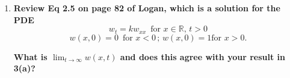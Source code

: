 \documentclass[11pt]{article}
\newenvironment{solution}
  {\renewcommand\qedsymbol{$\blacksquare$}\begin{proof}[Solution]}
  {\end{proof}}
\begin{document}
\begin{enumerate}
\begin{enumerate}
\textbf{What is the value of $\lim_{t\rightarrow \infty} u(x, t)$?}

\begin{solution}
$u$ is a solution to the diffusion equation on the infinite domain with bounded initial value $u(x, 0) = \phi(x)$. Consequently, the solution (in the Poisson Integral representation form) is 
\[ u(x, t) = \frac{1}{\sqrt{\pi}} \int_{-\infty}^{\infty} e^{-r^2} \phi(x-r\sqrt{4kt}) \, dr.\]

Splitting the integral up into two separate integrals, we get that
\[ u(x, t) = \frac{1}{\sqrt{\pi}} \left[\int_{-\infty}^{0} e^{-r^2} \phi(x-r\sqrt{4kt}) \, dr + \int_{0}^{\infty} e^{-r^2} \phi(x-r\sqrt{4kt}) \, dr \right] \]

\end{solution}



\item \textbf{Review Eq 2.5 on page 82 of Logan, which is a solution for the PDE}
\[ w_t = kw_{xx} \, \, \, \text{for } x \in \mathbb{R}, \, t > 0\]
\[ w(x, 0) = 0 \, \, \,\text{for } x < 0 \, ; \, w(x, 0) = 1 \text{for } x > 0.\]

\textbf{What is $\lim_{t \rightarrow \infty} w(x, t)$ and does this agree with your result in 3(a)?}
\end{enumerate}
\end{enumerate}
\end{document}
